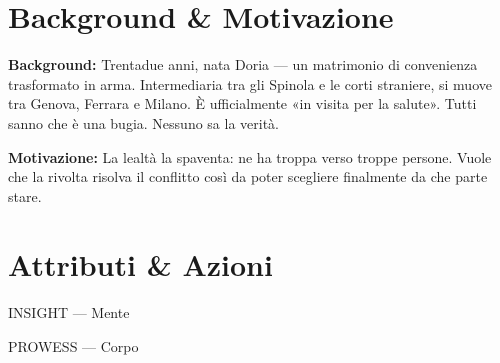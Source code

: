 \clearpage



\section*{Background \& Motivazione}
\begin{rulebox}{}
\textbf{Background:} Trentadue anni, nata Doria — un matrimonio di convenienza trasformato in arma. Intermediaria tra gli Spinola e le corti straniere, si muove tra Genova, Ferrara e Milano. È ufficialmente «in visita per la salute». Tutti sanno che è una bugia. Nessuno sa la verità.

\medskip\noindent\textcolor{SpinolaRed}{\textbf{Motivazione:}} La lealtà la spaventa: ne ha troppa verso troppe persone. Vuole che la rivolta risolva il conflitto così da poter scegliere finalmente da che parte stare.
\end{rulebox}

\section*{Attributi \& Azioni}

\begin{attributoblock}[SpinolaRed]{INSIGHT — Mente}
\end{attributoblock}
\begin{attributoblock}[SpinolaRed]{PROWESS — Corpo}
\end{attributoblock}

